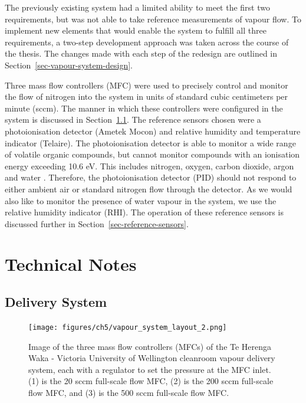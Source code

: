 \documentclass[
  a4paper,
]{scrbook}
\begin{document}
The previously existing system had a limited ability to meet the first
two requirements, but was not able to take reference measurements of
vapour flow. To implement new elements that would enable the system to
fulfill all three requirements, a two-step development approach was
taken across the course of the thesis. The changes made with each step
of the redesign are outlined in Section~\ref{sec-vapour-system-design}.

Three mass flow controllers (MFC) were used to precisely control and
monitor the flow of nitrogen into the system in units of standard cubic
centimeters per minute (sccm). The manner in which these controllers
were configured in the system is discussed in
Section~\ref{sec-delivery-system}. The reference sensors chosen were a
photoionisation detector (Ametek Mocon) and relative humidity and
temperature indicator (Telaire). The photoionisation detector is able to
monitor a wide range of volatile organic compounds, but cannot monitor
compounds with an ionisation energy exceeding 10.6 eV. This includes
nitrogen, oxygen, carbon dioxide, argon and water
\autocite{PIDmanual,Ionscience}. Therefore, the photoionisation detector
(PID) should not respond to either ambient air or standard nitrogen flow
through the detector. As we would also like to monitor the presence of
water vapour in the system, we use the relative humidity indicator
(RHI). The operation of these reference sensors is discussed further in
Section~\ref{sec-reference-sensors}.

\hypertarget{technical-notes}{%
\section{Technical Notes}\label{technical-notes}}

\hypertarget{sec-delivery-system}{%
\subsection{Delivery System}\label{sec-delivery-system}}

\begin{figure}

{\centering \texttt{[image: figures/ch5/vapour\_system\_layout\_2.png]}

}

\caption{\label{fig-mass-flow-controller-layout}Image of the three mass
flow controllers (MFCs) of the Te Herenga Waka - Victoria University of
Wellington cleanroom vapour delivery system, each with a regulator to
set the pressure at the MFC inlet. (1) is the 20 sccm full-scale flow
MFC, (2) is the 200 sccm full-scale flow MFC, and (3) is the 500 sccm
full-scale flow MFC.}

\end{figure}
\end{document}
